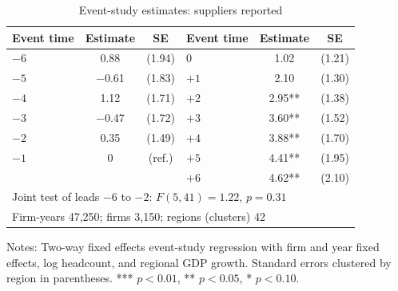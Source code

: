 \documentclass[11pt]{article}
\begin{document}
\begin{table}[ht]
\centering
\begin{threeparttable}
\caption{Event-study estimates: suppliers reported}
\label{tab:es}
\small
\begin{tabular}{lcc|lcc}
\toprule
Event time & Estimate & SE & Event time & Estimate & SE \\
\midrule
$-6$ & 0.88 & (1.94) & $0$ & 1.02 & (1.21) \\
$-5$ & $-$0.61 & (1.83) & $+1$ & 2.10 & (1.30) \\
$-4$ & 1.12 & (1.71) & $+2$ & 2.95** & (1.38) \\
$-3$ & $-$0.47 & (1.72) & $+3$ & 3.60** & (1.52) \\
$-2$ & 0.35 & (1.49) & $+4$ & 3.88** & (1.70) \\
$-1$ & 0 & (ref.) & $+5$ & 4.41** & (1.95) \\
 & & & $+6$ & 4.62** & (2.10) \\
\midrule
\multicolumn{6}{l}{Joint test of leads $-6$ to $-2$: $F(5, 41) = 1.22$, $p = 0.31$} \\
\multicolumn{6}{l}{Firm-years 47,250; firms 3,150; regions (clusters) 42} \\
\bottomrule
\end{tabular}
\begin{tablenotes}\footnotesize
\item Notes: Two-way fixed effects event-study regression with firm and year fixed effects, log headcount, and regional GDP growth. Standard errors clustered by region in parentheses. *** $p<0.01$, ** $p<0.05$, * $p<0.10$.
\end{tablenotes}
\end{threeparttable}
\end{table}
\end{document}
